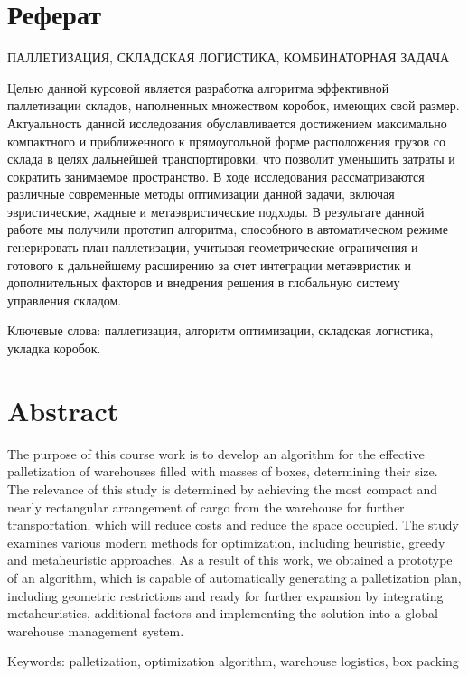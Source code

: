 \chapter*{Реферат}
ПАЛЛЕТИЗАЦИЯ, СКЛАДСКАЯ ЛОГИСТИКА, КОМБИНАТОРНАЯ ЗАДАЧА 

Целью данной курсовой является разработка алгоритма эффективной паллетизации складов, наполненных множеством коробок, имеющих свой размер. Актуальность данной исследования обуславливается достижением максимально компактного и приближенного к прямоугольной форме расположения грузов со склада в целях дальнейшей транспортировки, что позволит уменьшить затраты и сократить занимаемое пространство. В ходе исследования рассматриваются различные современные методы оптимизации данной задачи, включая эвристические, жадные и метаэвристические подходы. В результате данной работе мы получили прототип алгоритма, способного в автоматическом режиме генерировать план паллетизации, учитывая геометрические ограничения и готового к дальнейшему расширению за счет интеграции метаэвристик и дополнительных факторов и внедрения решения в глобальную систему управления складом. 

Ключевые слова: паллетизация, алгоритм оптимизации, складская логистика, укладка коробок.  




\chapter*{Abstract}
The purpose of this course work is to develop an algorithm for the effective palletization of warehouses filled with masses of boxes, determining their size. The relevance of this study is determined by achieving the most compact and nearly rectangular arrangement of cargo from the warehouse for further transportation, which will reduce costs and reduce the space occupied. The study examines various modern methods for optimization, including heuristic, greedy and metaheuristic approaches. As a result of this work, we obtained a prototype of an algorithm, which is capable of automatically generating a palletization plan, including geometric restrictions and ready for further expansion by integrating metaheuristics, additional factors and implementing the solution into a global warehouse management system.

Keywords: palletization, optimization algorithm, warehouse logistics, box packing

\pagestyle{plain} %
